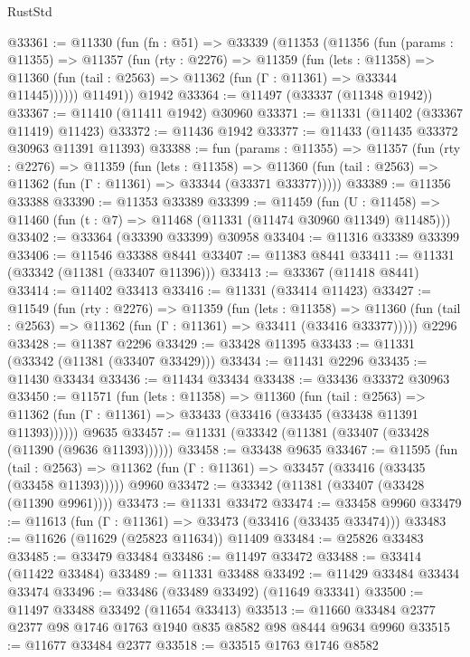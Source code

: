 \begin{lexlean}{RustStd}
\begin{coremodule}
@33361 := @11330
    (fun (fn : @51) =>
    @33339
      (@11353
        (@11356
          (fun (params : @11355) =>
          @11357
            (fun (rty : @2276) =>
            @11359
              (fun (lets : @11358) =>
              @11360 (fun (tail : @2563) => @11362 (fun (Γ : @11361) => @33344 @11445))))))
        @11491))
    @1942
@33364 := @11497 (@33337 (@11348 @1942))
@33367 := @11410 (@11411 @1942) @30960
@33371 := @11331 (@11402 (@33367 @11419) @11423)
@33372 := @11436 @1942
@33377 := @11433 (@11435 @33372 @30963 @11391 @11393)
@33388 := fun (params : @11355) =>
  @11357
    (fun (rty : @2276) =>
    @11359
      (fun (lets : @11358) =>
      @11360 (fun (tail : @2563) => @11362 (fun (Γ : @11361) => @33344 (@33371 @33377)))))
@33389 := @11356 @33388
@33390 := @11353 @33389
@33399 := @11459
    (fun (U : @11458) => @11460 (fun (t : @7) => @11468 (@11331 (@11474 @30960 @11349) @11485)))
@33402 := @33364 (@33390 @33399) @30958
@33404 := @11316 @33389 @33399
@33406 := @11546 @33388 @8441
@33407 := @11383 @8441
@33411 := @11331 (@33342 (@11381 (@33407 @11396)))
@33413 := @33367 (@11418 @8441)
@33414 := @11402 @33413
@33416 := @11331 (@33414 @11423)
@33427 := @11549
    (fun (rty : @2276) =>
    @11359
      (fun (lets : @11358) =>
      @11360 (fun (tail : @2563) => @11362 (fun (Γ : @11361) => @33411 (@33416 @33377)))))
    @2296
@33428 := @11387 @2296
@33429 := @33428 @11395
@33433 := @11331 (@33342 (@11381 (@33407 @33429)))
@33434 := @11431 @2296
@33435 := @11430 @33434
@33436 := @11434 @33434
@33438 := @33436 @33372 @30963
@33450 := @11571
    (fun (lets : @11358) =>
    @11360
      (fun (tail : @2563) =>
      @11362 (fun (Γ : @11361) => @33433 (@33416 (@33435 (@33438 @11391 @11393))))))
    @9635
@33457 := @11331 (@33342 (@11381 (@33407 (@33428 (@11390 (@9636 @11393))))))
@33458 := @33438 @9635
@33467 := @11595
    (fun (tail : @2563) => @11362 (fun (Γ : @11361) => @33457 (@33416 (@33435 (@33458 @11393)))))
    @9960
@33472 := @33342 (@11381 (@33407 (@33428 (@11390 @9961))))
@33473 := @11331 @33472
@33474 := @33458 @9960
@33479 := @11613 (fun (Γ : @11361) => @33473 (@33416 (@33435 @33474)))
@33483 := @11626 (@11629 (@25823 @11634)) @11409
@33484 := @25826 @33483
@33485 := @33479 @33484
@33486 := @11497 @33472
@33488 := @33414 (@11422 @33484)
@33489 := @11331 @33488
@33492 := @11429 @33484 @33434 @33474
@33496 := @33486 (@33489 @33492) (@11649 @33341)
@33500 := @11497 @33488 @33492 (@11654 @33413)
@33513 := @11660 @33484 @2377 @2377 @98 @1746 @1763 @1940 @835 @8582 @98 @8444 @9634 @9960
@33515 := @11677 @33484 @2377
@33518 := @33515 @1763 @1746 @8582

\end{coremodule}
\end{lexlean}
